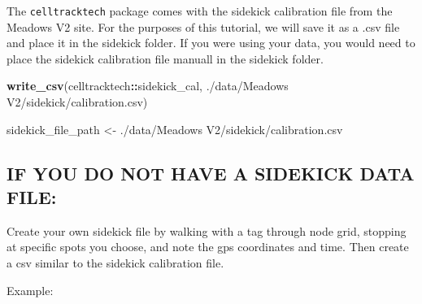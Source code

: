 \documentclass[
]{book}
\newenvironment{Shaded}{\begin{snugshade}}{\end{snugshade}}
\newcommand{\FunctionTok}[1]{\textcolor[rgb]{0.13,0.29,0.53}{\textbf{#1}}}
\newcommand{\NormalTok}[1]{#1}
\newcommand{\OtherTok}[1]{\textcolor[rgb]{0.56,0.35,0.01}{#1}}
\newcommand{\SpecialCharTok}[1]{\textcolor[rgb]{0.81,0.36,0.00}{\textbf{#1}}}
\newcommand{\StringTok}[1]{\textcolor[rgb]{0.31,0.60,0.02}{#1}}
\begin{document}
The \texttt{celltracktech} package comes with the sidekick calibration file from the Meadows V2 site. For the purposes of this tutorial, we will save it as a .csv file and place it in the sidekick folder. If you were using your data, you would need to place the sidekick calibration file manuall in the sidekick folder.

\begin{Shaded}
\begin{Highlighting}[]
\FunctionTok{write\_csv}\NormalTok{(celltracktech}\SpecialCharTok{::}\NormalTok{sidekick\_cal, }\StringTok{\textquotesingle{}./data/Meadows V2/sidekick/calibration.csv\textquotesingle{}}\NormalTok{)}

\NormalTok{sidekick\_file\_path }\OtherTok{\textless{}{-}} \StringTok{\textquotesingle{}./data/Meadows V2/sidekick/calibration.csv\textquotesingle{}}
\end{Highlighting}
\end{Shaded}

\subsection{IF YOU DO NOT HAVE A SIDEKICK DATA FILE:}\label{if-you-do-not-have-a-sidekick-data-file}

Create your own sidekick file by walking with a tag through node grid, stopping at specific spots you choose, and note the gps coordinates and time. Then create a csv similar to the sidekick calibration file.

Example:
\end{document}
